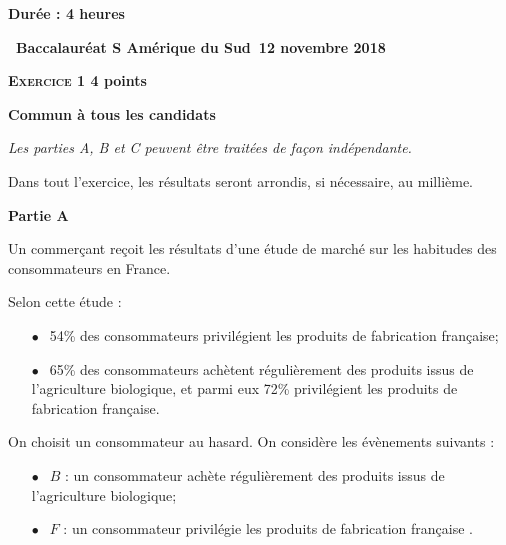 \documentclass[10pt,a4paper]{article}
\begin{document}
\renewcommand \footrulewidth{.2pt}
\pagestyle{fancy}
\thispagestyle{empty}

\begin{center}
\textbf{Durée : 4 heures}

\vspace{0,25cm}

{\Large\textbf{\decofourleft~Baccalauréat  S Amérique du Sud~12 novembre 2018~\decofourright}}\end{center}

\vspace{0,5cm}

\textbf{\textsc{Exercice 1} \hfill 4 points}

\textbf{Commun à tous les candidats}

\medskip

\emph{Les parties {\rm A},  {\rm B} et  {\rm C} peuvent être traitées de façon indépendante.}

Dans tout l'exercice, les résultats seront arrondis, si nécessaire, au millième.

\bigskip

\textbf{Partie A}

\medskip

Un commerçant reçoit les résultats d'une étude de marché sur les habitudes des consommateurs en France.

Selon cette étude :

\setlength\parindent{8mm}
\begin{itemize}
\item[$\bullet~~$] 54\:\% des consommateurs privilégient les produits de fabrication française;
\item[$\bullet~~$] 65\:\% des consommateurs achètent régulièrement des produits issus de l'agriculture
biologique, et parmi eux 72\:\% privilégient les produits de fabrication française.
\end{itemize}
\setlength\parindent{0mm}

On choisit un consommateur au hasard. On considère les évènements suivants :

\setlength\parindent{8mm}
\begin{itemize}
\item[$\bullet~~$] $B$ : \og un consommateur achète régulièrement des produits issus de l'agriculture biologique\fg ;
\item[$\bullet~~$] $F$ : \og un consommateur privilégie les produits de fabrication française \fg.
\end{itemize}
\setlength\parindent{0mm}
\end{document}
